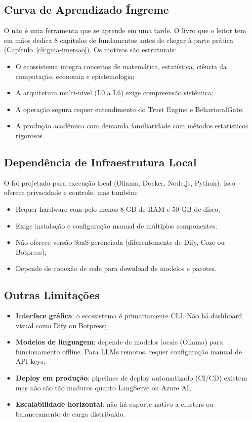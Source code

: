 \subsection{Curva de Aprendizado Íngreme}

O \opencodeeco{} não é uma ferramenta que se aprende em uma tarde. O
livro que o leitor tem em mãos dedica 8 capítulos de fundamentos antes
de chegar à parte prática (Capítulo~\ref{ch:guia-imersao}). Os motivos
são estruturais:
\begin{itemize}
    \item O ecossistema integra conceitos de matemática, estatística,
          ciência da computação, economia e epistemologia;
    \item A arquitetura multi-nível (L0 a L6) exige compreensão
          sistêmica;
    \item A operação segura requer entendimento do Trust Engine e
          BehavioralGate;
    \item A produção acadêmica com \qualisA{} demanda familiaridade
          com métodos estatísticos rigorosos.
\end{itemize}

\subsection{Dependência de Infraestrutura Local}

O \opencodeeco{} foi projetado para execução local (Ollama, Docker,
Node.js, Python). Isso oferece privacidade e controle, mas também:
\begin{itemize}
    \item Requer hardware com pelo menos 8 GB de RAM e 50 GB de disco;
    \item Exige instalação e configuração manual de múltiplos
          componentes;
    \item Não oferece versão SaaS gerenciada (diferentemente de Dify,
          Coze ou Botpress);
    \item Depende de conexão de rede para download de modelos e
          pacotes.
\end{itemize}

\subsection{Outras Limitações}

\begin{itemize}
    \item \textbf{Interface gráfica}: o ecossistema é primariamente
          CLI. Não há dashboard visual como Dify ou Botpress;
    \item \textbf{Modelos de linguagem}: depende de modelos locais
          (Ollama) para funcionamento offline. Para LLMs remotos,
          requer configuração manual de API keys;
    \item \textbf{Deploy em produção}: pipelines de deploy
          automatizado (CI/CD) existem mas não são tão maduros quanto
          LangServe ou Azure AI;
    \item \textbf{Escalabilidade horizontal}: não há suporte nativo a
          clusters ou balanceamento de carga distribuído.
\end{itemize}

